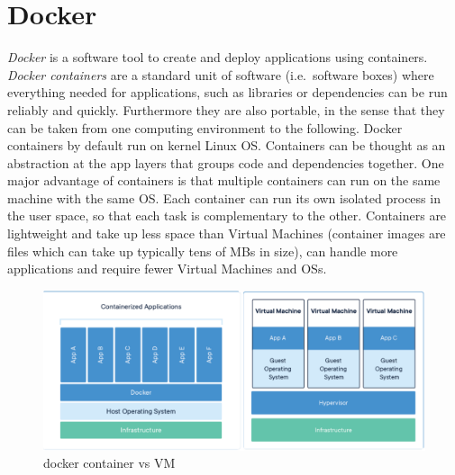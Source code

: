 \documentclass[
  12pt,
  a4paper,
  oneside]{book}
\begin{document}
\hypertarget{docker}{%
\section{Docker}\label{docker}}

\emph{Docker} is a software tool to create and deploy applications using containers.
\emph{Docker containers} are a standard unit of software (i.e.~software boxes) where everything needed for applications, such as libraries or dependencies can be run reliably and quickly. Furthermore they are also portable, in the sense that they can be taken from one computing environment to the following. Docker containers by default run on kernel Linux OS.
Containers can be thought as an abstraction at the app layers that groups code and dependencies together. One major advantage of containers is that multiple containers can run on the same machine with the same OS. Each container can run its own isolated process in the user space, so that each task is complementary to the other. Containers are lightweight and take up less space than Virtual Machines (container images are files which can take up typically tens of MBs in size), can handle more applications and require fewer Virtual Machines and OSs.

\begin{figure}
\centering
\includegraphics{images/dockerVSvirtualmachines.PNG}
\caption{docker container vs VM}
\end{figure}
\end{document}
